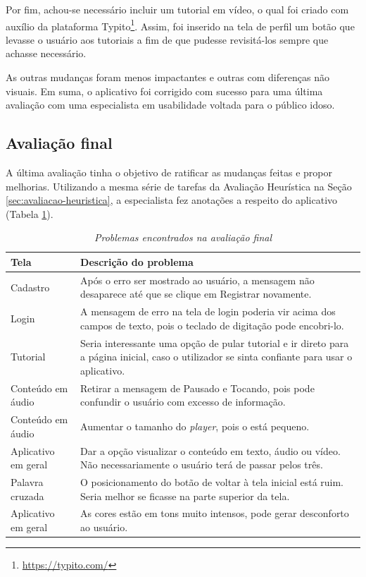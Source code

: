 Por fim, achou-se necessário incluir um tutorial em vídeo, o qual foi criado com auxílio da plataforma Typito\footnote{\url{https://typito.com/}}. Assim, foi inserido na tela de perfil um botão que levasse o usuário aos tutoriais a fim de que pudesse revisitá-los sempre que achasse necessário.

As outras mudanças foram menos impactantes e outras com diferenças não visuais. Em suma, o aplicativo foi corrigido com sucesso para uma última avaliação com uma especialista em usabilidade voltada para o público idoso.

\subsection{Avaliação final}
A última avaliação tinha o objetivo de ratificar as mudanças feitas e propor melhorias. Utilizando a mesma série de tarefas da Avaliação Heurística na Seção \ref{sec:avaliacao-heuristica}, a especialista fez anotações a respeito do aplicativo (Tabela \ref{tab:avaliacao_final}).

\begin{table}[H]
\centering
\caption{\textit{Problemas encontrados na avaliação final}}
\centering
\footnotesize
\begin{tabular}{p{4cm} p{12cm}}
\toprule
 \textbf{Tela} & \textbf{Descrição do problema}       
\\ \midrule
Cadastro
&
Após o erro ser mostrado ao usuário, a mensagem não desaparece até que se clique em Registrar novamente.
\\ \midrule
Login
&
A mensagem de erro na tela de login poderia vir acima dos campos de texto, pois o teclado de digitação pode encobri-lo.
\\ \midrule
Tutorial
&
Seria interessante uma opção de pular tutorial e ir direto para a página inicial, caso o utilizador se sinta confiante para usar o aplicativo.
\\ \midrule
Conteúdo em áudio
&
Retirar a mensagem de Pausado e Tocando, pois pode confundir o usuário com excesso de informação.
\\ \midrule
Conteúdo em áudio
&
Aumentar o tamanho do \textit{player}, pois o está pequeno.
\\ \midrule
Aplicativo em geral
&
Dar a opção visualizar o conteúdo em texto, áudio ou vídeo. Não necessariamente o usuário terá de passar pelos três.
\\ \midrule
Palavra cruzada
&
O posicionamento do botão de voltar à tela inicial está ruim. Seria melhor se ficasse na parte superior da tela.
\\ \midrule
Aplicativo em geral
&
As cores estão em tons muito intensos, pode gerar desconforto ao usuário.
\\ \bottomrule

\end{tabular}
\label{tab:avaliacao_final}
\end{table}

